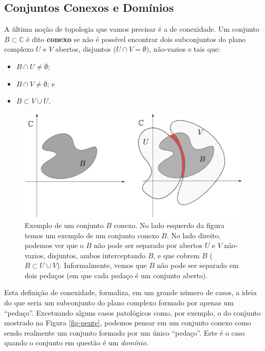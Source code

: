 \subsection{Conjuntos Conexos e Domínios}
\label{subsec-coonj-conexos-dominios}

A última noção de topologia que vamos precisar é a de conexidade. 
Um conjunto $B\subset \mathbb{C}$ é dito {\bf conexo} 
se não é possível encontrar dois subconjuntos do plano complexo $U$ e $V$ abertos, 
disjuntos ($U\cap V = \emptyset)$, não-vazios e tais que: 
\begin{itemize}
	\item $B\cap U\neq \emptyset$;  
	\item $B\cap V\neq \emptyset$; e
	\item $B\subset V\cup U$.
\end{itemize}

\begin{figure}[H]
\centering
\includegraphics[width=0.9\linewidth]{"Figuras/fig-conjuntos-conexos"}
\caption[Conjunto Conexo]{Exemplo de um conjunto $B$ conexo. No lado esquerdo da figura temos um exemplo de um conjunto conexo $B$. 
No lado direito, podemos ver que o $B$ não pode ser separado 
por abertos $U$ e $V$ não-vazios, disjuntos, ambos interceptando $B$, e que cobrem $B$ ($B\subset U\cup V$).
Informalmente, vemos que $B$ não pode ser separado em dois pedaços (em que cada pedaço é um 
conjunto aberto). }
\label{fig:conjuntos-conexos}
\end{figure}


Esta definição de conexidade, formaliza, em um grande número de casos, a ideia do que seria 
um subconjunto do plano complexo formado por apenas um ``pedaço''. 
Excetuando alguns casos patológicos como, por exemplo, 
o do conjunto mostrado na Figura \ref{fig-pente}, podemos pensar em um 
conjunto conexo como sendo realmente um conjunto formado por um único ``pedaço''. 
Este é o caso quando o conjunto em questão é um \textit{domínio}.  



